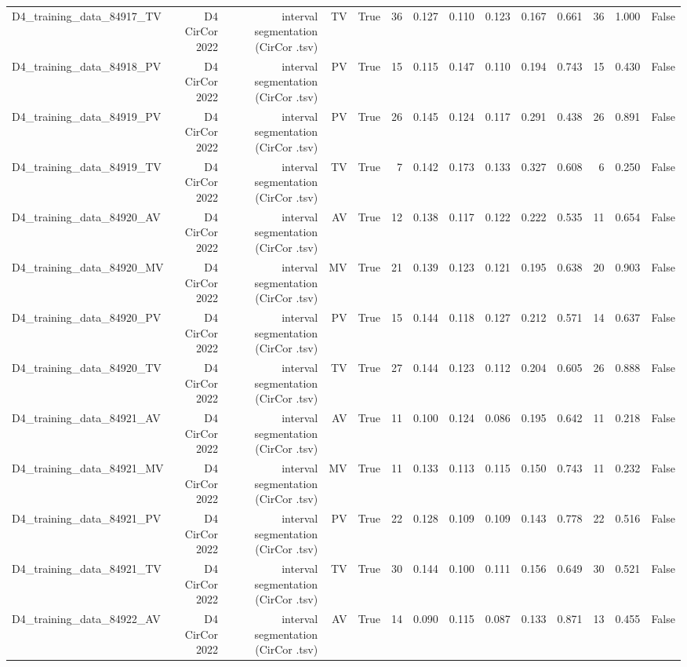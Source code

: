 \begin{table}[htbp]
\begin{tabular}{lrrrrrrrrrrrrr}
    D4\_training\_data\_84917\_TV & D4 CirCor 2022 & interval segmentation (CirCor .tsv) & TV & True & 36 & 0.127 & 0.110 & 0.123 & 0.167 & 0.661 & 36 & 1.000 & False \\
    D4\_training\_data\_84918\_PV & D4 CirCor 2022 & interval segmentation (CirCor .tsv) & PV & True & 15 & 0.115 & 0.147 & 0.110 & 0.194 & 0.743 & 15 & 0.430 & False \\
    D4\_training\_data\_84919\_PV & D4 CirCor 2022 & interval segmentation (CirCor .tsv) & PV & True & 26 & 0.145 & 0.124 & 0.117 & 0.291 & 0.438 & 26 & 0.891 & False \\
    D4\_training\_data\_84919\_TV & D4 CirCor 2022 & interval segmentation (CirCor .tsv) & TV & True & 7 & 0.142 & 0.173 & 0.133 & 0.327 & 0.608 & 6 & 0.250 & False \\
    D4\_training\_data\_84920\_AV & D4 CirCor 2022 & interval segmentation (CirCor .tsv) & AV & True & 12 & 0.138 & 0.117 & 0.122 & 0.222 & 0.535 & 11 & 0.654 & False \\
    D4\_training\_data\_84920\_MV & D4 CirCor 2022 & interval segmentation (CirCor .tsv) & MV & True & 21 & 0.139 & 0.123 & 0.121 & 0.195 & 0.638 & 20 & 0.903 & False \\
    D4\_training\_data\_84920\_PV & D4 CirCor 2022 & interval segmentation (CirCor .tsv) & PV & True & 15 & 0.144 & 0.118 & 0.127 & 0.212 & 0.571 & 14 & 0.637 & False \\
    D4\_training\_data\_84920\_TV & D4 CirCor 2022 & interval segmentation (CirCor .tsv) & TV & True & 27 & 0.144 & 0.123 & 0.112 & 0.204 & 0.605 & 26 & 0.888 & False \\
    D4\_training\_data\_84921\_AV & D4 CirCor 2022 & interval segmentation (CirCor .tsv) & AV & True & 11 & 0.100 & 0.124 & 0.086 & 0.195 & 0.642 & 11 & 0.218 & False \\
    D4\_training\_data\_84921\_MV & D4 CirCor 2022 & interval segmentation (CirCor .tsv) & MV & True & 11 & 0.133 & 0.113 & 0.115 & 0.150 & 0.743 & 11 & 0.232 & False \\
    D4\_training\_data\_84921\_PV & D4 CirCor 2022 & interval segmentation (CirCor .tsv) & PV & True & 22 & 0.128 & 0.109 & 0.109 & 0.143 & 0.778 & 22 & 0.516 & False \\
    D4\_training\_data\_84921\_TV & D4 CirCor 2022 & interval segmentation (CirCor .tsv) & TV & True & 30 & 0.144 & 0.100 & 0.111 & 0.156 & 0.649 & 30 & 0.521 & False \\
    D4\_training\_data\_84922\_AV & D4 CirCor 2022 & interval segmentation (CirCor .tsv) & AV & True & 14 & 0.090 & 0.115 & 0.087 & 0.133 & 0.871 & 13 & 0.455 & False \\

\end{tabular}
\end{table}
